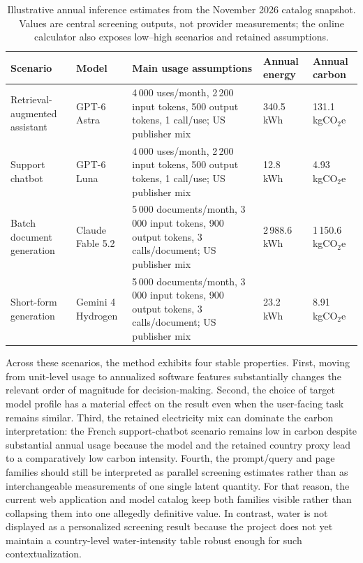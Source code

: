 \documentclass[11pt,a4paper]{article}
\begin{document}
\begin{table}[htbp]
\centering
\small
\begin{tabularx}{\textwidth}{|L{2.8cm}|L{2.0cm}|Y|L{1.9cm}|L{1.9cm}|}
\hline
Scenario & Model & Main usage assumptions & Annual energy & Annual carbon \\
\hline
Retrieval-augmented assistant & GPT-6 Astra \cite{openai_gpt6_astra2026} & 4\,000 uses/month, 2\,200 input tokens, 500 output tokens, 1 call/use; US publisher mix & 340.5 kWh & 131.1 kgCO$_2$e \\
\hline
Support chatbot & GPT-6 Luna \cite{openai_gpt6_solluna2026} & 4\,000 uses/month, 2\,200 input tokens, 500 output tokens, 1 call/use; US publisher mix & 12.8 kWh & 4.93 kgCO$_2$e \\
\hline
Batch document generation & Claude Fable 5.2 \cite{anthropic_fablemythos2026} & 5\,000 documents/month, 3\,000 input tokens, 900 output tokens, 3 calls/document; US publisher mix & 2\,988.6 kWh & 1\,150.6 kgCO$_2$e \\
\hline
Short-form generation & Gemini 4 Hydrogen \cite{google_gemini4_hydrogen2026} & 5\,000 documents/month, 3\,000 input tokens, 900 output tokens, 3 calls/document; US publisher mix & 23.2 kWh & 8.91 kgCO$_2$e \\
\hline
\end{tabularx}
\caption{Illustrative annual inference estimates from the November 2026 catalog snapshot. Values are central screening outputs, not provider measurements; the online calculator also exposes low--high scenarios and retained assumptions.}
\label{tab:scenario-examples}
\end{table}

Across these scenarios, the method exhibits four stable properties. First, moving from unit-level usage to annualized software features substantially changes the relevant order of magnitude for decision-making. Second, the choice of target model profile has a material effect on the result even when the user-facing task remains similar. Third, the retained electricity mix can dominate the carbon interpretation: the French support-chatbot scenario remains low in carbon despite substantial annual usage because the model and the retained country proxy lead to a comparatively low carbon intensity. Fourth, the prompt/query and page families should still be interpreted as parallel screening estimates rather than as interchangeable measurements of one single latent quantity. For that reason, the current web application and model catalog keep both families visible rather than collapsing them into one allegedly definitive value. In contrast, water is not displayed as a personalized screening result because the project does not yet maintain a country-level water-intensity table robust enough for such contextualization.
\end{document}
